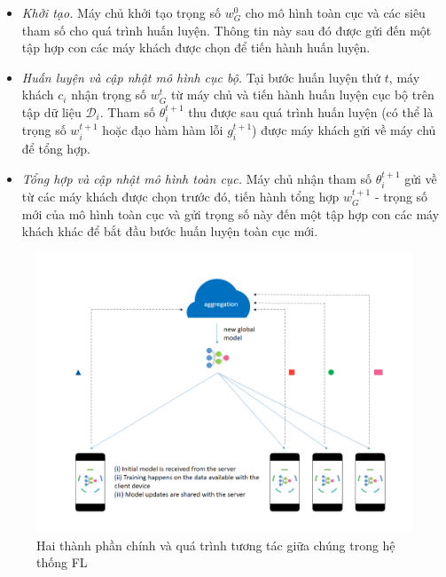 \begin{itemize}
    \item \textit{Khởi tạo.} Máy chủ khởi tạo trọng số $w_G^0$ cho mô hình toàn cục và các siêu tham số cho quá trình huấn luyện. Thông tin này sau đó được gửi đến một tập hợp con các máy khách được chọn để tiến hành huấn luyện.

    \item \textit{Huấn luyện và cập nhật mô hình cục bộ.} Tại bước huấn luyện thứ $t$, máy khách $c_i$ nhận trọng số $w_G^t$ từ máy chủ và tiến hành huấn luyện cục bộ trên tập dữ liệu $\mathcal{D}_i$. Tham số $\theta_i^{t+1}$ thu được sau quá trình huấn luyện (có thể là trọng số $w_i^{t+1}$ hoặc đạo hàm hàm lỗi $g_i^{t+1}$) được máy khách gửi về máy chủ để tổng hợp.

    \item \textit{Tổng hợp và cập nhật mô hình toàn cục.} Máy chủ nhận tham số $\theta_i^{t+1}$ gửi về từ các máy khách được chọn trước đó, tiến hành tổng hợp $w_G^{t+1}$ - trọng số mới của mô hình toàn cục và gửi trọng số này đến một tập hợp con các máy khách khác để bắt đầu bước huấn luyện toàn cục mới.
\end{itemize}

\begin{figure}[H]
    \begin{center}
        \includegraphics[scale=0.85]{images/fl.png}
        \caption{Hai thành phần chính và quá trình tương tác giữa chúng trong hệ thống FL \cite{chandorikar_2020}}
        \label{fig:fl}
    \end{center}
\end{figure}

